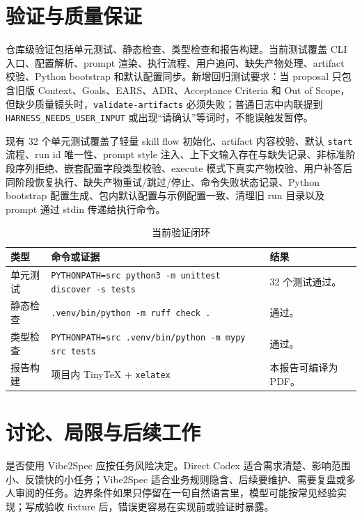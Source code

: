 \documentclass[11pt,a4paper]{article}
\newcommand{\code}[1]{\texttt{\small #1}}
\begin{document}
\section{验证与质量保证}

仓库级验证包括单元测试、静态检查、类型检查和报告构建。当前测试覆盖 CLI 入口、配置解析、prompt 渲染、执行流程、用户追问、缺失产物处理、artifact 校验、Python bootstrap 和默认配置同步。新增回归测试要求：当 proposal 只包含旧版 Context、Goals、EARS、ADR、Acceptance Criteria 和 Out of Scope，但缺少质量镜头时，\code{validate-artifacts} 必须失败；普通日志中内联提到 \code{HARNESS\_NEEDS\_USER\_INPUT} 或出现“请确认”等词时，不能误触发暂停。

现有 32 个单元测试覆盖了轻量 skill flow 初始化、artifact 内容校验、默认 \code{start} 流程、run id 唯一性、prompt style 注入、上下文输入存在与缺失记录、非标准阶段序列拒绝、嵌套配置字段类型校验、execute 模式下真实产物校验、用户补答后同阶段恢复执行、缺失产物重试/跳过/停止、命令失败状态记录、Python bootstrap 配置生成、包内默认配置与示例配置一致、清理旧 run 目录以及 prompt 通过 stdin 传递给执行命令。

\begin{table}[htbp]
\centering
\caption{当前验证闭环}
\label{tab:verification}
\begin{tabular}{P{0.22\textwidth}P{0.43\textwidth}P{0.25\textwidth}}
\toprule
类型 & 命令或证据 & 结果 \\
\midrule
单元测试 & \code{PYTHONPATH=src python3 -m unittest discover -s tests} & 32 个测试通过。 \\
静态检查 & \code{.venv/bin/python -m ruff check .} & 通过。 \\
类型检查 & \code{PYTHONPATH=src .venv/bin/python -m mypy src tests} & 通过。 \\
报告构建 & 项目内 TinyTeX + \code{xelatex} & 本报告可编译为 PDF。 \\
\bottomrule
\end{tabular}
\end{table}

\section{讨论、局限与后续工作}

是否使用 Vibe2Spec 应按任务风险决定。Direct Codex 适合需求清楚、影响范围小、反馈快的小任务；Vibe2Spec 适合业务规则隐含、后续要维护、需要复盘或多人审阅的任务。边界条件如果只停留在一句自然语言里，模型可能按常见经验实现；写成验收 fixture 后，错误更容易在实现前或验证时暴露。
\end{document}
